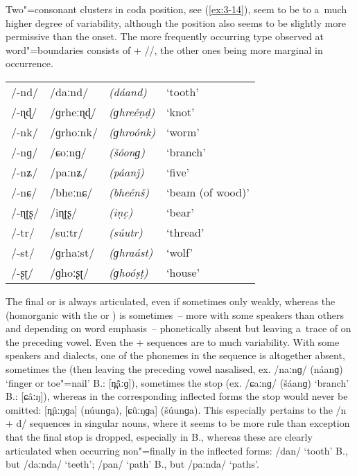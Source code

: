 Two"=consonant clusters in coda position, see (\ref{ex:3-14}), seem to be  to a~much higher degree of variability, although the position also seems to be slightly more permissive than the onset. The more frequently occurring type observed at word"=boundaries consists of  + //, the other ones being more marginal in occurrence. 


\begin{exe}
\extab
\label{ex:3-14}
\begin{tabular}{ l l l l }
/-nd/ &
/daːnd/ &
\textit{(dáand)} &
`tooth'\\
/-ɳɖ/ &
/ɡrheːɳɖ/ &
\textit{(ɡhreéṇḍ)} &
`knot'\\
/-nk/ &
/ɡrhoːnk/ &
\textit{(ɡhroónk)} &
`worm'\\
/-nɡ/ &
/ɕoːnɡ/ &
\textit{(šóonɡ) } &
`branch'\\
/-nʑ/ &
/paːnʑ/ &
\textit{(páanǰ) } &
`five' \\
/-nɕ/ &
/bheːnɕ/ &
\textit{(bheénš) } &
`beam (of wood)' \\
/-ɳʈʂ/ &
/iɳʈʂ/ &
\textit{(iṇc̣) } &
`bear' \\
/-tr/ &
/suːtr/ &
\textit{(súutr)} &
`thread' \\
/-st/ &
/ɡrhaːst/ &
\textit{(ɡhraást)} &
`wolf' \\
/-ʂʈ/ &
/ɡhoːʂʈ/ &
\textit{(ɡhoóṣṭ) } &
`house'\\
\end{tabular}
\end{exe}


The final  or  is always articulated, even if sometimes only weakly, whereas the
 (homorganic with the  or ) is sometimes~-- more with some speakers than
others and depending on word emphasis~-- phonetically absent but leaving a~trace of  on
the preceding vowel. Even the  +  sequences are  to much variability. With some
speakers and dialects, one of the phonemes in the sequence is altogether absent, sometimes the 
(then leaving the preceding vowel nasalised, ex. /naːnɡ/
(náanɡ) `finger or toe"=nail' B.: [n̪\^{ã}ːɡ]), sometimes the stop (ex. /ɕaːnɡ/ (\v{s}áanɡ)
`branch' B.: [ɕâːŋ]), whereas in the corresponding inflected forms the stop would never be
omitted: [n̪ûːŋɡa] (núunɡa), [ɕûːŋɡa]
(\v{s}úunɡa). This especially pertains to the /n +
d/ sequences in singular nouns, where it seems to be more rule than exception that the final stop is dropped, especially in B., whereas these are clearly articulated when occurring non"=finally in the inflected forms: /dan/ `tooth' B., but /daːnda/ `teeth'; /pan/ `path' B., but /paːnda/ `paths'.


